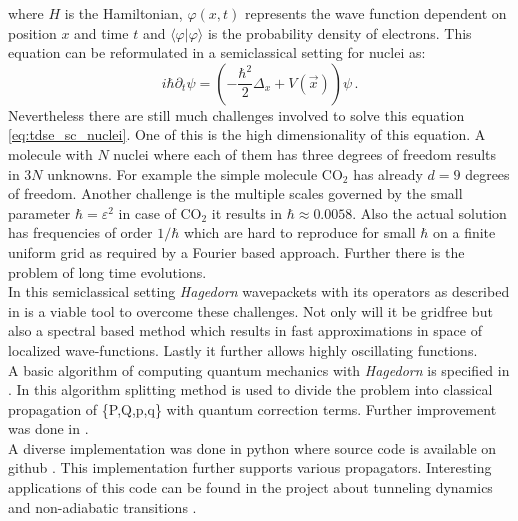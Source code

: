 where $H$ is the Hamiltonian, $\varphi(x,t)$ represents the wave function dependent on position $x$ and
time $t$ and $\langle \varphi | \varphi  \rangle$ is the probability density of electrons. This equation can be reformulated in a semiclassical setting for nuclei as: \
\begin{equation}
\label{eq:tdse_sc_nuclei}
 i\hbar \partial_{t}\psi = \left( -\frac{\hbar^{2}}{2} \Delta_{x} + V(\vec{x}) \right) \psi\,.
\end{equation}
Nevertheless there are still much challenges involved to solve this equation \ref{eq:tdse_sc_nuclei}. One of this is the high dimensionality of this equation. A molecule with $N$ nuclei where each of them has three degrees of freedom results in $3N$ unknowns. For example the simple molecule $\mathrm{CO_{2}}$ has already $d=9$ degrees of freedom. Another challenge is the multiple scales governed by the small parameter $\hbar = \varepsilon^{2}$ in case of $\mathrm{CO_{2}}$ it results in $\hbar \approx 0.0058$. Also the actual solution has frequencies of order $1/\hbar$ which are hard to reproduce for small $\hbar$ on a finite uniform grid as required by a Fourier based approach. Further there is the problem of long time evolutions.\\

In this semiclassical setting \textit{Hagedorn} wavepackets with its operators as described in \cite{H_ladder_operators} is a viable tool to overcome these challenges. Not only will it be gridfree but also a spectral based method which results in fast approximations in space of localized wave-functions. Lastly it further allows highly oscillating functions.\\


A basic algorithm of computing quantum mechanics with \textit{Hagedorn} is specified in \cite{FGL_semiclassical_dynamics}. In this algorithm splitting method is used to divide the problem into classical propagation of \{P,Q,p,q\} with quantum correction terms.
Further improvement was done in \cite{GH_convsemiclassical}.\\

A diverse implementation was done in python \cite{B_master_thesis} where source code is available on github \cite{waveblocksnd}. This implementation further supports various propagators. Interesting applications of this code can be found in the project about tunneling dynamics \cite{GHJ_tunneling_spawning} and non-adiabatic transitions \cite{BGH_natac}.\\

